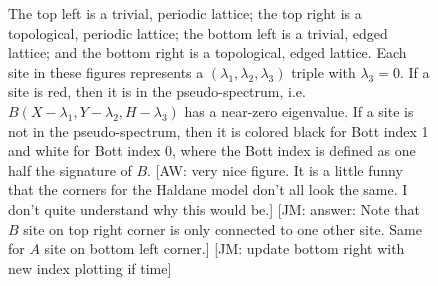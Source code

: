 \documentclass[a4paper]{article}
\newcommand{\aw}[1]{{\color{blue} [AW: #1]}}
\newcommand{\jm}[1]{{\color{red} [JM: #1]}}
\begin{document}
\begin{figure}
\centering
{}%
%

%
%
\caption{The top left is a trivial, periodic lattice; the top right is a topological, periodic lattice; the bottom left is a trivial, edged lattice; and the bottom right is a topological, edged lattice.
Each site in these figures represents a $(\lambda_1,\lambda_2,\lambda_3)$ triple with $\lambda_3 = 0$.
If a site is red, then it is in the pseudo-spectrum, i.e. $B(X - \lambda_1, Y - \lambda_2, H - \lambda_3)$ has a near-zero eigenvalue.
If a site is not in the pseudo-spectrum, then it is colored black for Bott index 1 and white for Bott index 0, where the Bott index is defined as one half the signature of $B$. \aw{very nice figure. It is a little funny that the corners for the Haldane model don't all look the same. I don't quite understand why this would be.} \jm{answer: Note that $B$ site on top right corner is only connected to one other site. Same for $A$ site on bottom left corner.}
\jm{update bottom right with new index plotting if time}
}%
\label{fig:haldane_index}%
\end{figure}
\end{document}
